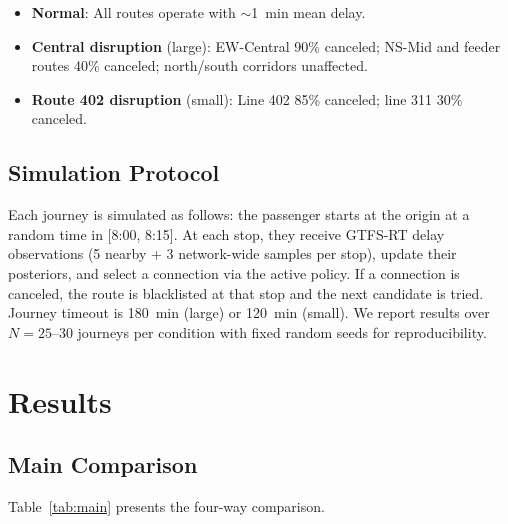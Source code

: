 \documentclass[journal]{IEEEtran}
\begin{document}
\begin{itemize}
    \item \textbf{Normal}: All routes operate with $\sim$1~min mean delay.
    \item \textbf{Central disruption} (large): EW-Central 90\% canceled; NS-Mid and feeder routes 40\% canceled; north/south corridors unaffected.
    \item \textbf{Route 402 disruption} (small): Line 402 85\% canceled; line 311 30\% canceled.
\end{itemize}

\subsection{Simulation Protocol}

Each journey is simulated as follows: the passenger starts at the origin at a random time in [8:00, 8:15]. At each stop, they receive GTFS-RT delay observations (5 nearby + 3 network-wide samples per stop), update their posteriors, and select a connection via the active policy. If a connection is canceled, the route is blacklisted at that stop and the next candidate is tried. Journey timeout is 180~min (large) or 120~min (small). We report results over $N = 25$--$30$ journeys per condition with fixed random seeds for reproducibility.

\section{Results}
\label{sec:results}

\subsection{Main Comparison}

Table~\ref{tab:main} presents the four-way comparison.
\end{document}
